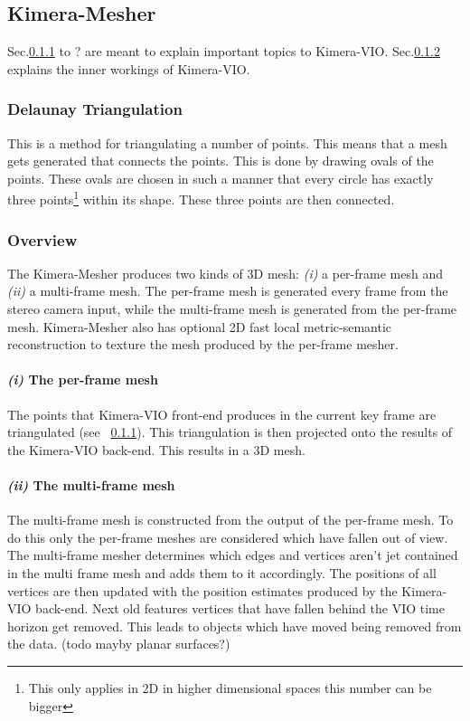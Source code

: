 \documentclass[11pt,a4paper]{article}
\begin{document}
\subsection{Kimera-Mesher}
Sec.\ref{pre:delaunay} to ? are meant to explain important topics to Kimera-VIO.
Sec.\ref{Sec:K-Mesher overview} explains the inner workings of Kimera-VIO.
\subsubsection{Delaunay Triangulation} \label{pre:delaunay}
This is a method for triangulating a number of points. This means that a mesh gets generated that connects the points.
This is done by drawing ovals of the points. 
These ovals are chosen in such a manner that every circle has exactly three points\footnote{This only applies in 2D in higher dimensional spaces this number can be bigger} within its shape. 
These three points are then connected.  
\subsubsection{Overview} \label{Sec:K-Mesher overview}
The Kimera-Mesher produces two kinds of 3D mesh: \textit{(i)} a per-frame mesh and \textit{(ii)} a multi-frame mesh. The per-frame mesh is generated every frame from the stereo camera input, while the multi-frame mesh is generated from the per-frame mesh.
Kimera-Mesher also has optional 2D fast local metric-semantic reconstruction to texture the mesh produced by the per-frame mesher.
\paragraph{\textit{(i)} The per-frame mesh}
The points that Kimera-VIO front-end produces in the current key frame are triangulated (see ~\ref{pre:delaunay}).
This triangulation is then projected onto the results of the Kimera-VIO back-end. This results in a 3D mesh. 

\paragraph{\textit{(ii)} The multi-frame mesh}
The multi-frame mesh is constructed from the output of the per-frame mesh.
To do this only the per-frame meshes are considered which have fallen out of view.
The multi-frame mesher determines which edges and vertices aren't jet contained in the multi frame mesh and adds them to it accordingly. 
The positions of all vertices are then updated with the position estimates produced by the Kimera-VIO back-end.
Next old features vertices that have fallen behind the VIO time horizon get removed. 
This leads to objects which have moved being removed from the data. 
(todo mayby planar surfaces?)
\end{document}
